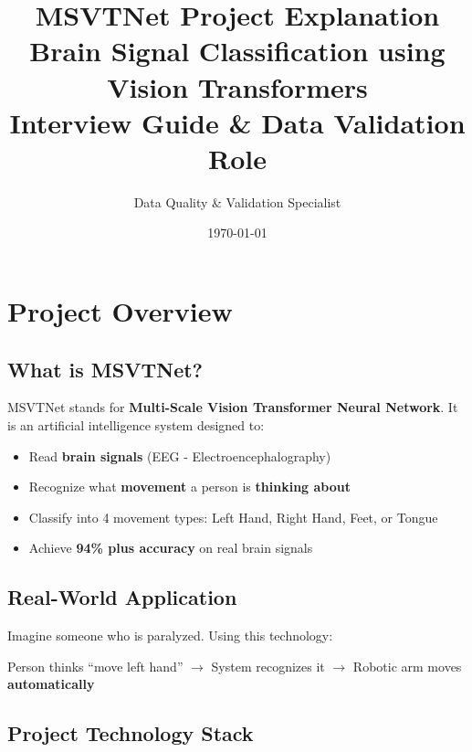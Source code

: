 \documentclass[12pt,a4paper]{article}
\title{\textbf{\Large MSVTNet Project Explanation}\\
\textbf{Brain Signal Classification using Vision Transformers}\\
\normalsize Interview Guide \& Data Validation Role}
\author{Data Quality \& Validation Specialist}
\date{\today}
\begin{document}
\maketitle

\tableofcontents
\newpage

\section{Project Overview}

\subsection{What is MSVTNet?}

MSVTNet stands for \textbf{Multi-Scale Vision Transformer Neural Network}. It is an artificial intelligence system designed to:

\begin{itemize}
    \item Read \textbf{brain signals} (EEG - Electroencephalography)
    \item Recognize what \textbf{movement} a person is \textbf{thinking about}
    \item Classify into 4 movement types: Left Hand, Right Hand, Feet, or Tongue
    \item Achieve \textbf{94\% plus accuracy} on real brain signals
\end{itemize}

\subsection{Real-World Application}

Imagine someone who is paralyzed. Using this technology:

\begin{tcolorbox}[colback=blue!10,colframe=blue!50!black,title=Use Case]
Person thinks ``move left hand'' $\rightarrow$ System recognizes it $\rightarrow$ Robotic arm moves \textbf{automatically}
\end{tcolorbox}

\subsection{Project Technology Stack}
\end{document}
